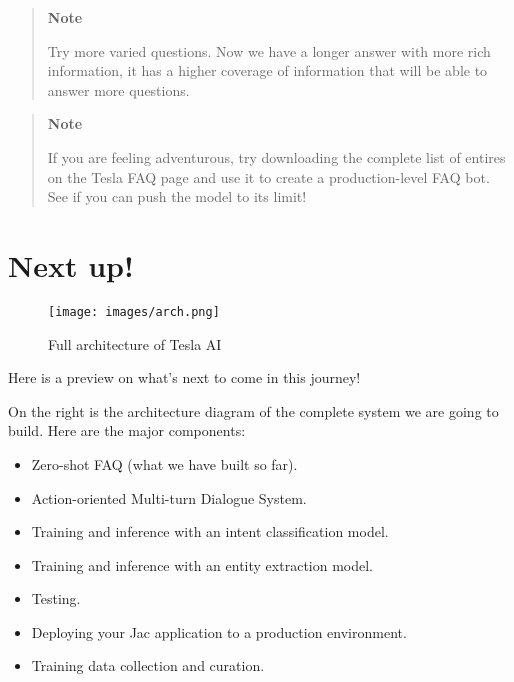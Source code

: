 \begin{quote}
\textbf{Note}

Try more varied questions. Now we have a longer answer with more rich
information, it has a higher coverage of information that will be able
to answer more questions.
\end{quote}

\begin{quote}
\textbf{Note}

If you are feeling adventurous, try downloading the complete list of
entires on the Tesla FAQ page and use it to create a production-level
FAQ bot. See if you can push the model to its limit!
\end{quote}

\section{Next up!}\label{next-up}

\begin{figure}
\centering
\texttt{[image: images/arch.png]}
\caption{Full architecture of Tesla AI}
\end{figure}

Here is a preview on what's next to come in this journey!

On the right is the architecture diagram of the complete system we are
going to build. Here are the major components:

\begin{itemize}
\tightlist
\item
  Zero-shot FAQ (what we have built so far).
\item
  Action-oriented Multi-turn Dialogue System.
\item
  Training and inference with an intent classification model.
\item
  Training and inference with an entity extraction model.
\item
  Testing.
\item
  Deploying your Jac application to a production environment.
\item
  Training data collection and curation.
\end{itemize}
